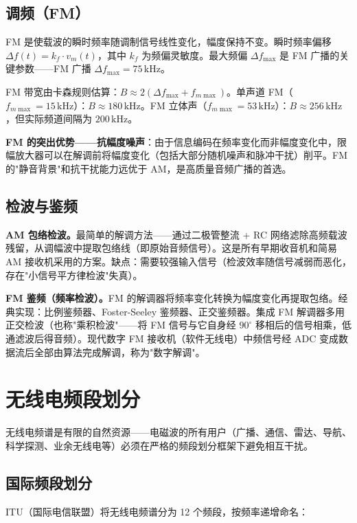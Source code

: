 \documentclass[12pt,UTF8]{ctexbook}
\begin{document}
\subsection{调频（FM）}

FM 是使载波的瞬时频率随调制信号线性变化，幅度保持不变。瞬时频率偏移 $\Delta f(t) = k_f \cdot v_m(t)$，其中 $k_f$ 为频偏灵敏度。最大频偏 $\Delta f_{\max}$ 是 FM 广播的关键参数——FM 广播 $\Delta f_{\max}=75\,\mathrm{kHz}$。

FM 带宽由卡森规则估算：$B \approx 2(\Delta f_{\max}+f_{m\max})$。单声道 FM（$f_{m\max}=15\,\mathrm{kHz}$）：$B\approx 180\,\mathrm{kHz}$。FM 立体声（$f_{m\max}=53\,\mathrm{kHz}$）：$B\approx 256\,\mathrm{kHz}$，但实际频道间隔为 $200\,\mathrm{kHz}$。

\textbf{FM 的突出优势——抗幅度噪声}：由于信息编码在频率变化而非幅度变化中，限幅放大器可以在解调前将幅度变化（包括大部分随机噪声和脉冲干扰）削平。FM 的"静音背景"和抗干扰能力远优于 AM，是高质量音频广播的首选。

\subsection{检波与鉴频}

\textbf{AM 包络检波。}最简单的解调方法——通过二极管整流 + RC 网络滤除高频载波残留，从调幅波中提取包络线（即原始音频信号）。这是所有早期收音机和简易 AM 接收机采用的方案。缺点：需要较强输入信号（检波效率随信号减弱而恶化，存在"小信号平方律检波"失真）。

\textbf{FM 鉴频（频率检波）。}FM 的解调器将频率变化转换为幅度变化再提取包络。经典实现：比例鉴频器、Foster-Seeley 鉴频器、正交鉴频器。集成 FM 解调器多用正交检波（也称"乘积检波"——将 FM 信号与它自身经 $90^\circ$ 移相后的信号相乘，低通滤波后得音频）。现代数字 FM 接收机（软件无线电）中频信号经 ADC 变成数据流后全部由算法完成解调，称为"数字解调"。

\section{无线电频段划分}
\label{sec:frequency_allocation}

无线电频谱是有限的自然资源——电磁波的所有用户（广播、通信、雷达、导航、科学探测、业余无线电等）必须在严格的频段划分框架下避免相互干扰。

\subsection{国际频段划分}

ITU（国际电信联盟）将无线电频谱分为 12 个频段，按频率递增命名：
\end{document}
